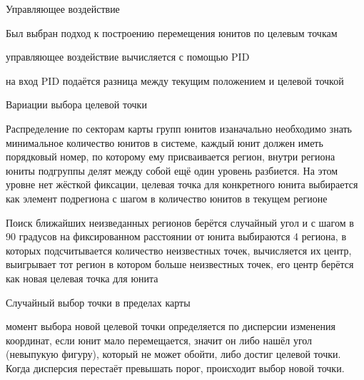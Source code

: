 \begin{docsec}{Управляющее воздействие}

\item Был выбран подход к построению перемещения юнитов по целевым точкам

\item управляющее воздействие вычисляется с помощью PID
\item на вход PID подаётся разница между текущим положением и целевой
      точкой
\item Вариации выбора целевой точки
    \begin{mintemize}
        \item Распределение по секторам карты групп юнитов \newline
        изаначально необходимо знать минимальное количество юнитов в системе,
        каждый юнит должен иметь порядковый номер, по которому ему присваивается
        регион, внутри региона юниты подгруппы делят между собой ещё один уровень
        разбиется. На этом уровне нет жёсткой фиксации, целевая точка для
        конкретного юнита выбирается как элемент подрегиона с шагом в
        количество юнитов в текущем регионе

        \item Поиск ближайших неизведанных регионов \newline
        берётся случайный угол и с шагом в 90 градусов на фиксированном
        расстоянии от юнита выбираются 4 региона, в которых подсчитывается 
        количество неизвестных точек, вычисляется их центр, выигрывает
        тот регион в котором больше неизвестных точек, его центр берётся
        как новая целевая точка для юнита

        \item Случайный выбор точки в пределах карты
    \end{mintemize}

\item момент выбора новой целевой точки определяется по дисперсии
      изменения координат, если юнит мало перемещается,
      значит он либо нашёл угол (невыпукую фигуру), который не может
      обойти, либо достиг целевой точки. Когда дисперсия перестаёт
      превышать порог, происходит выбор новой точки.

\end{docsec}


